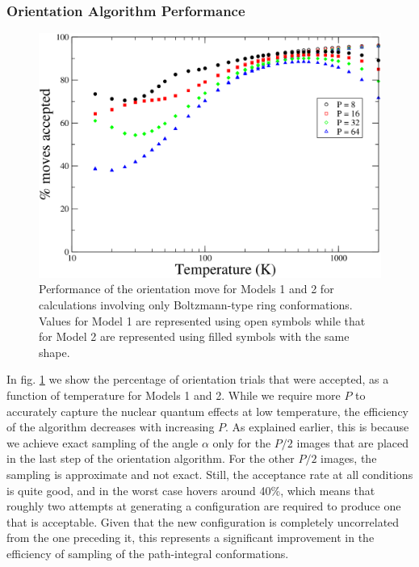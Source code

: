             \subsubsection{Orientation Algorithm Performance}
                \label{sec:orPerformance}
                \begin{figure}[!htbp]
                    \centering
                    \includegraphics[scale=0.20,keepaspectratio]{Chapter-4/Figures/s12orAcc.png}
                    \caption{Performance of the orientation move for Models 1 and 2 for calculations involving only Boltzmann-type ring conformations. Values for Model 1 are represented using open symbols while that for Model 2 are represented using filled symbols with the same shape.}
                    \label{fig:r0Acc}
                \end{figure}

                In fig. \ref{fig:r0Acc} we show the percentage of orientation trials that were accepted, as a function of temperature for Models 1 and 2. While we require more $P$ to accurately capture the nuclear quantum effects at low temperature, the efficiency of the algorithm decreases with increasing $P$. As explained earlier, this is because we achieve exact sampling of the angle $\alpha$ only for the $P/2$ images that are placed in the last step of the orientation algorithm. For the other $P/2$ images, the sampling is approximate and not exact. Still, the acceptance rate at all conditions is quite good, and in the worst case hovers around 40\%, which means that roughly two attempts at generating a configuration are required to produce one that is acceptable. Given that the new configuration is completely uncorrelated from the one preceding it, this represents a significant improvement in the efficiency of sampling of the path-integral conformations.

